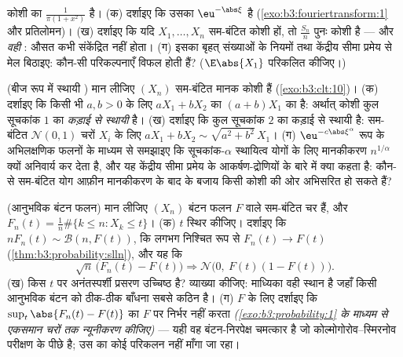 \begin{exercise}[$\star\star$]\label{exo:b3:clt:10}
कोशी  का  $\frac1{\pi(1 + x^2)}$ है।
(क) दर्शाइए कि उसका  $\eu^{-\abs\xi}$ है (\cref{exo:b3:fouriertransform:1} और प्रतिलोमन)।
(ख) दर्शाइए कि यदि $X_1, \dots, X_n$  सम-बंटित कोशी हों, तो $\frac{S_n}n$ पुनः
कोशी है --- और \emph{वही} : औसत कभी संकेंद्रित नहीं होता।
(ग) इसका बृहत् संख्याओं के नियमों तथा केंद्रीय सीमा प्रमेय से मेल
बिठाइए: कौन-सी परिकल्पनाएँ विफल होती हैं? ($\E\abs{X_1}$ परिकलित कीजिए।)
\end{exercise}

\begin{exercise}[$\star\star$]\label{exo:b3:clt:11}
(बीज रूप में स्थायी ) मान लीजिए $(X_n)$  सम-बंटित
मानक कोशी हैं (\cref{exo:b3:clt:10})।
(क) दर्शाइए कि किसी भी $a, b > 0$ के लिए $aX_1 + bX_2$ का  $(a + b)X_1$ का
है: अर्थात् कोशी कुल सूचकांक $1$ का \emph{कड़ाई से स्थायी} है।
(ख) दर्शाइए कि  कुल सूचकांक $2$ का कड़ाई से स्थायी है:
 सम-बंटित $\mathcal N(0,1)$ चरों $X_i$ के लिए $aX_1 + bX_2 \sim \sqrt{a^2 + b^2}\,X_1$।
(ग) $\eu^{-c\abs\xi^\alpha}$ रूप के अभिलक्षणिक फलनों के माध्यम से समझाइए कि सूचकांक-$\alpha$
स्थायित्व योगों के लिए मानकीकरण $n^{1/\alpha}$ क्यों अनिवार्य कर देता है,
और यह केंद्रीय सीमा प्रमेय के आकर्षण-द्रोणियों के बारे में क्या
कहता है: कौन-से  सम-बंटित योग आफ़ीन मानकीकरण के बाद 
के बजाय किसी कोशी  की ओर अभिसरित हो सकते हैं?
\end{exercise}

\begin{exercise}[$\star\star$]\label{exo:b3:clt:12}
(आनुभविक बंटन फलन) मान लीजिए $(X_n)$ बंटन फलन $F$ वाले 
सम-बंटित चर हैं, और $F_n(t) =
\frac1n\#\{k \leq n : X_k \leq t\}$।
(क) $t$ स्थिर कीजिए। दर्शाइए कि $n F_n(t) \sim \mathcal B(n, F(t))$, कि लगभग निश्चित रूप से
$F_n(t) \to F(t)$ (\cref{thm:b3:probability:slln}), और यह कि
\[
\sqrt n\,\bigl(F_n(t) - F(t)\bigr) \Longrightarrow
\mathcal N\bigl(0,\ F(t)(1 - F(t))\bigr) .
\]
(ख) किस $t$ पर अनंतस्पर्शी प्रसरण उच्चिष्ठ है? व्याख्या कीजिए:
माध्यिका वही स्थान है जहाँ किसी आनुभविक बंटन को ठीक-ठीक बाँधना सबसे
कठिन है।
(ग)  $F$ के लिए दर्शाइए कि $\sup_t\abs{F_n(t) - F(t)}$ का  $F$ पर निर्भर
नहीं करता \emph{(\cref{exo:b3:probability:1} के माध्यम से एकसमान चरों तक न्यूनीकरण
कीजिए)} --- यही वह बंटन-निरपेक्ष चमत्कार है जो कोल्मोगोरोव--स्मिरनोव
परीक्षण के पीछे है; उस  का कोई परिकलन नहीं माँगा जा रहा।
\end{exercise}

